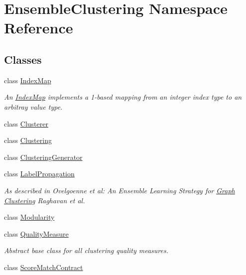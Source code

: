 \hypertarget{namespace_ensemble_clustering}{\section{Ensemble\-Clustering Namespace Reference}
\label{namespace_ensemble_clustering}
}
\subsection*{Classes}
\begin{DoxyCompactItemize}
\item 
class \hyperlink{class_ensemble_clustering_1_1_index_map}{Index\-Map}
\begin{DoxyCompactList}\small\item\em An \hyperlink{class_ensemble_clustering_1_1_index_map}{Index\-Map} implements a 1-\/based mapping from an integer index type to an arbitray value type. \end{DoxyCompactList}\item 
class \hyperlink{class_ensemble_clustering_1_1_clusterer}{Clusterer}
\item 
class \hyperlink{class_ensemble_clustering_1_1_clustering}{Clustering}
\item 
class \hyperlink{class_ensemble_clustering_1_1_clustering_generator}{Clustering\-Generator}
\item 
class \hyperlink{class_ensemble_clustering_1_1_label_propagation}{Label\-Propagation}
\begin{DoxyCompactList}\small\item\em As described in Ovelgoenne et al\-: An Ensemble Learning Strategy for \hyperlink{class_ensemble_clustering_1_1_graph}{Graph} \hyperlink{class_ensemble_clustering_1_1_clustering}{Clustering} Raghavan et al. \end{DoxyCompactList}\item 
class \hyperlink{class_ensemble_clustering_1_1_modularity}{Modularity}
\item 
class \hyperlink{class_ensemble_clustering_1_1_quality_measure}{Quality\-Measure}
\begin{DoxyCompactList}\small\item\em Abstract base class for all clustering quality measures. \end{DoxyCompactList}\item 
class \hyperlink{class_ensemble_clustering_1_1_score_match_contract}{Score\-Match\-Contract}
\item 

\end{DoxyCompactItemize}
